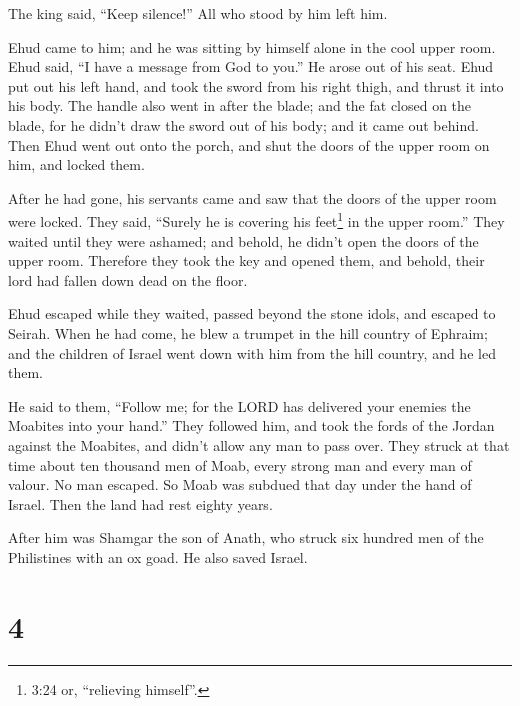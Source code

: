 The king said, ``Keep silence!'' All who stood by him left him.

 Ehud came to him; and he was sitting by himself alone in
the cool upper room. Ehud said, ``I have a message from God to you.'' He
arose out of his seat.  Ehud put out his left hand, and
took the sword from his right thigh, and thrust it into his body.
 The handle also went in after the blade; and the fat
closed on the blade, for he didn't draw the sword out of his body; and
it came out behind.  Then Ehud went out onto the porch, and
shut the doors of the upper room on him, and locked them.

 After he had gone, his servants came and saw that the
doors of the upper room were locked. They said, ``Surely he is covering
his feet\footnote{3:24 or, ``relieving himself''.} in the upper room.''
 They waited until they were ashamed; and behold, he didn't
open the doors of the upper room. Therefore they took the key and opened
them, and behold, their lord had fallen down dead on the floor.

 Ehud escaped while they waited, passed beyond the stone
idols, and escaped to Seirah.  When he had come, he blew a
trumpet in the hill country of Ephraim; and the children of Israel went
down with him from the hill country, and he led them.

 He said to them, ``Follow me; for the LORD has delivered
your enemies the Moabites into your hand.'' They followed him, and took
the fords of the Jordan against the Moabites, and didn't allow any man
to pass over.  They struck at that time about ten thousand
men of Moab, every strong man and every man of valour. No man escaped.
 So Moab was subdued that day under the hand of Israel.
Then the land had rest eighty years.

 After him was Shamgar the son of Anath, who struck six
hundred men of the Philistines with an ox goad. He also saved Israel.

\hypertarget{section-3}{%
\section{4}\label{section-3}}

